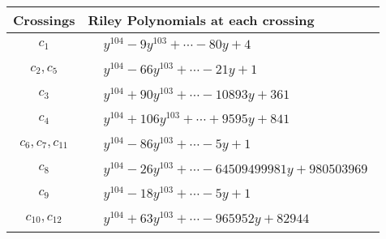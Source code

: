 \documentclass[1p]{elsarticle_modified}
\theoremstyle{definition}
\begin{document}
\begin{tabular}{m{50pt}|m{274pt}}
Crossings & \hspace{64pt}Riley Polynomials at each crossing \\
\hline $$\begin{aligned}c_{1}\end{aligned}$$&$\begin{aligned}
&y^{104}-9 y^{103}+\cdots-80 y+4
\end{aligned}$\\
\hline $$\begin{aligned}c_{2},c_{5}\end{aligned}$$&$\begin{aligned}
&y^{104}-66 y^{103}+\cdots-21 y+1
\end{aligned}$\\
\hline $$\begin{aligned}c_{3}\end{aligned}$$&$\begin{aligned}
&y^{104}+90 y^{103}+\cdots-10893 y+361
\end{aligned}$\\
\hline $$\begin{aligned}c_{4}\end{aligned}$$&$\begin{aligned}
&y^{104}+106 y^{103}+\cdots+9595 y+841
\end{aligned}$\\
\hline $$\begin{aligned}c_{6},c_{7},c_{11}\end{aligned}$$&$\begin{aligned}
&y^{104}-86 y^{103}+\cdots-5 y+1
\end{aligned}$\\
\hline $$\begin{aligned}c_{8}\end{aligned}$$&$\begin{aligned}
&y^{104}-26 y^{103}+\cdots-64509499981 y+980503969
\end{aligned}$\\
\hline $$\begin{aligned}c_{9}\end{aligned}$$&$\begin{aligned}
&y^{104}-18 y^{103}+\cdots-5 y+1
\end{aligned}$\\
\hline $$\begin{aligned}c_{10},c_{12}\end{aligned}$$&$\begin{aligned}
&y^{104}+63 y^{103}+\cdots-965952 y+82944
\end{aligned}$\\
\hline
\end{tabular}\\~\\
\end{document}
